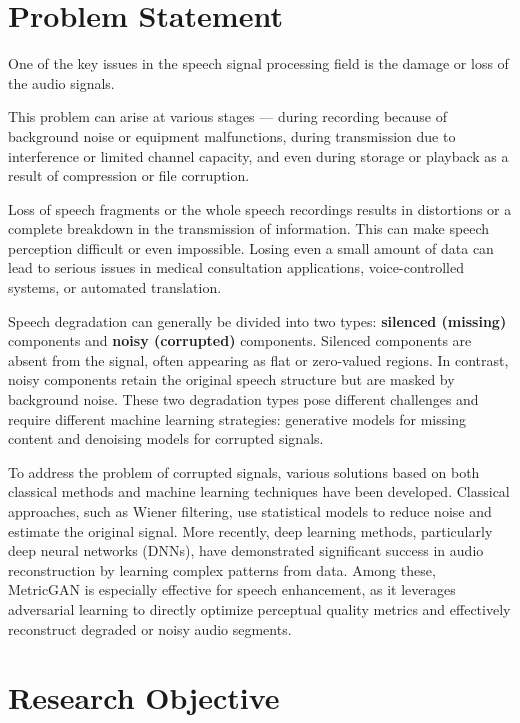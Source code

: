 \section{Problem Statement}
One of the key issues in the speech signal processing field is the damage or loss of the audio signals.

This problem can arise at various stages — during recording because of background noise or equipment malfunctions, during transmission due to interference or limited channel capacity, and even during storage or playback as a result of compression or file corruption.

Loss of speech fragments or the whole speech recordings results in distortions or a complete breakdown in the transmission of information. This can make speech perception difficult or even impossible. Losing even a small amount of data can lead to serious issues in medical consultation applications, voice-controlled systems, or automated translation.

Speech degradation can generally be divided into two types: \textbf{silenced (missing)} components and \textbf{noisy (corrupted)} components. Silenced components are absent from the signal, often appearing as flat or zero-valued regions. In contrast, noisy components retain the original speech structure but are masked by background noise. These two degradation types pose different challenges and require different machine learning strategies: generative models for missing content and denoising models for corrupted signals.

To address the problem of corrupted signals, various solutions based on both classical methods and machine learning techniques have been developed. Classical approaches, such as Wiener filtering, use statistical models to reduce noise and estimate the original signal. More recently, deep learning methods, particularly deep neural networks (DNNs), have demonstrated significant success in audio reconstruction by learning complex patterns from data. Among these, MetricGAN is especially effective for speech enhancement, as it leverages adversarial learning to directly optimize perceptual quality metrics and effectively reconstruct degraded or noisy audio segments.


\section{Research Objective}

